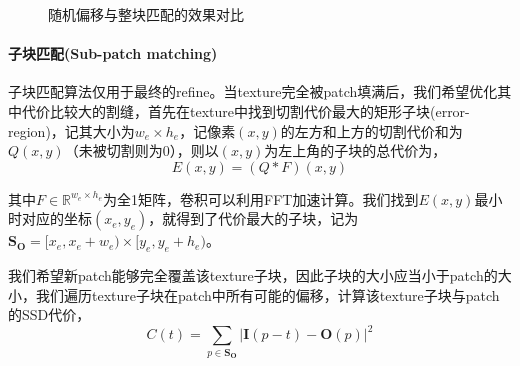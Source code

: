 \documentclass[11pt,a4paper]{article}
\begin{document}
\begin{figure}[H]
    \caption{随机偏移与整块匹配的效果对比}
    \label{fig:fill_patch}
\end{figure}

\paragraph{子块匹配(Sub-patch matching)} 子块匹配算法仅用于最终的refine。当texture完全被patch填满后，我们希望优化其中代价比较大的割缝，首先在texture中找到切割代价最大的矩形子块(error-region)，记其大小为$w_e \times h_e$，记像素$(x,y)$的左方和上方的切割代价和为$Q(x,y)$（未被切割则为0），则以$(x,y)$为左上角的子块的总代价为，
\begin{equation}
    E(x,y) = (Q * F)(x,y)
\end{equation}

其中$F \in \mathbb{R}^{w_e \times h_e}$为全1矩阵，卷积可以利用FFT加速计算。我们找到$E(x,y)$最小时对应的坐标$(x_e,y_e)$，就得到了代价最大的子块，记为$\mathbf{S}_{\mathbf{O}}=[x_e,x_e+w_e) \times [y_e,y_e+h_e)$。

我们希望新patch能够完全覆盖该texture子块，因此子块的大小应当小于patch的大小，我们遍历texture子块在patch中所有可能的偏移，计算该texture子块与patch的SSD代价，
\begin{equation}\label{eq:sub_patch}
    C(t) = \sum_{p\in \mathbf{S}_{\mathbf{O}}}|\mathbf{I}(p-t)-\mathbf{O}(p)|^2
\end{equation}
\end{document}
